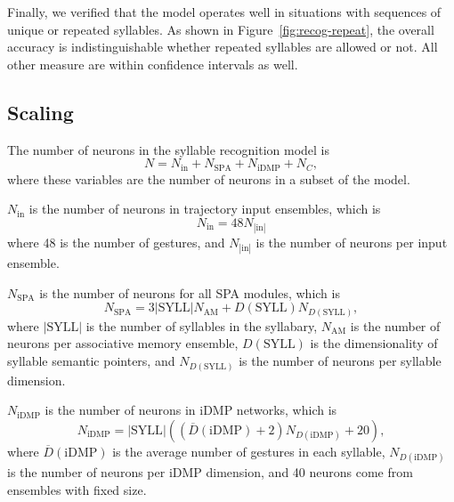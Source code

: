 
Finally, we verified that the model
operates well in situations with
sequences of unique or repeated syllables.
As shown in Figure~\ref{fig:recog-repeat},
the overall accuracy is indistinguishable
whether repeated syllables are allowed or not.
All other measure are within confidence intervals as well.

\subsection{Scaling}
\label{sec:res-recog-scaling}

The number of neurons in the
syllable recognition model is
\begin{equation*}
  N = N_{\text{in}} + N_{\text{SPA}} + N_{\text{iDMP}} + N_C,
\end{equation*}
where these variables
are the number of neurons in
a subset of the model.

$N_{\text{in}}$ is the number of neurons
in trajectory input ensembles, which is
\begin{equation*}
  N_{\text{in}} = 48 N_{|\text{in}|}
\end{equation*}
where 48 is the number of gestures,
and $N_{|\text{in}|}$ is the number of neurons
per input ensemble.

$N_{\text{SPA}}$ is the number of
neurons for all SPA modules,
which is
\begin{equation*}
  N_{\text{SPA}} = 3 |\text{SYLL}| N_{\text{AM}}
    + D(\text{SYLL}) N_{D(\text{SYLL})},
\end{equation*}
where $|\text{SYLL}|$ is the number of
syllables in the syllabary,
$N_{\text{AM}}$ is the number of neurons
per associative memory ensemble,
$D(\text{SYLL})$ is the dimensionality
of syllable semantic pointers,
and $N_{D(\text{SYLL})}$ is the number of neurons
per syllable dimension.

$N_{\text{iDMP}}$ is the number of neurons
in iDMP networks, which is
\begin{equation*}
  N_{\text{iDMP}} = |\text{SYLL}| \left( \left(\overline{D}(\text{iDMP})
  + 2 \right) N_{D(\text{iDMP})} + 20 \right),
\end{equation*}
where $\overline{D}(\text{iDMP})$ is the average
number of gestures in each syllable,
$N_{D(\text{iDMP})}$ is the number of neurons
per iDMP dimension,
and 40 neurons come from ensembles with fixed size.

